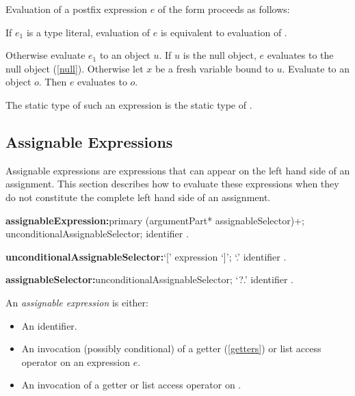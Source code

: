 \documentclass{article}
\begin{document}
\LMHash{}
Evaluation of a postfix expression $e$ of the form 
proceeds as follows:

If $e_1$ is a type literal, evaluation of $e$ is equivalent to
evaluation of .

Otherwise evaluate $e_1$ to an object $u$.
If $u$ is the null object, $e$ evaluates to the null object (\ref{null}).
Otherwise let $x$ be a fresh variable bound to $u$.
Evaluate  to an object $o$.
Then $e$ evaluates to $o$.

\LMHash{}
The static type of such an expression is the static type of .


\subsection{Assignable Expressions}

\LMHash{}
Assignable expressions are expressions that can appear on the left hand side of an assignment.
This section describes how to evaluate these expressions when they do not constitute the complete left hand side of an assignment.


\begin{grammar}
{\bf assignableExpression:}primary (argumentPart* assignableSelector)+;
  \SUPER{} unconditionalAssignableSelector;
  identifier
  .

{\bf unconditionalAssignableSelector:}`[' expression `]';
  `{\escapegrammar .}' identifier
  .

{\bf assignableSelector:}unconditionalAssignableSelector;
  `{\escapegrammar ?.}' identifier
  .
\end{grammar}

\LMHash{}
An {\em assignable expression} is either:
\begin{itemize}
\item An identifier.
\item An invocation (possibly conditional) of a getter (\ref{getters}) or list access operator on an expression $e$.
\item An invocation of a getter or list access operator on \SUPER{}.
\end{itemize}
\end{document}
